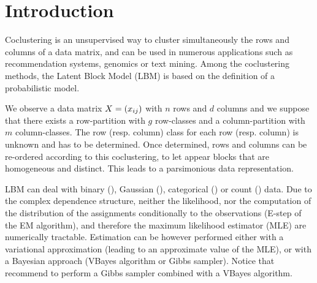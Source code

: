 \documentclass[bj]{imsart}
\numberwithin{equation}{section}
\theoremstyle{plain}
\theoremstyle{remark}
\begin{document}
\section{Introduction}

Coclustering is an unsupervised way to cluster simultaneously the rows and columns of a data matrix, and can be used in numerous applications such as recommendation systems, genomics or text mining. Among the coclustering methods, the Latent Block Model (LBM) is based on the definition of a probabilistic model. 

We observe a data matrix  $X=(x_{ij})$ with $n$ rows and $d$ columns and we suppose that there exists a row-partition with $g$ row-classes and a column-partition with $m$ column-classes.
The row (resp. column) class for each row (resp. column) is unknown and has to be determined. Once determined, rows and columns can be re-ordered according to this coclustering, to let appear blocks that are  homogeneous and distinct. This leads to a parsimonious data representation. 

LBM can deal with binary (\cite{govaert2008block}), Gaussian (\cite{lomet2012}), categorical (\cite{keribin2015estimation}) or count (\cite{govaert2010latent}) data. Due to the complex dependence structure, neither the likelihood, nor the computation of the distribution of the assignments conditionally to the observations (E-step of the EM algorithm), and therefore the maximum likelihood estimator (MLE)  are  numerically tractable. Estimation can be however performed either with a variational approximation (leading to an approximate value of the MLE), or with a Bayesian approach (VBayes algorithm or Gibbs sampler). Notice that \cite{keribin2015estimation} recommend to perform a Gibbs sampler combined with a VBayes algorithm. 
\end{document}
